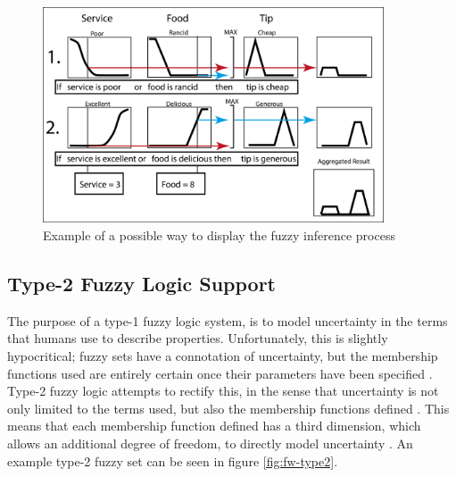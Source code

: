 \begin{figure}[ht!]
	\begin{center}
		\includegraphics[width=0.9\textwidth]{images/inference}
	\end{center}
	\vspace{-2mm}
	\caption{Example of a possible way to display the fuzzy inference process}
	\label{fig:fw-inf}
	\vspace{-1mm}
\end{figure}

\subsection{Type-2 Fuzzy Logic Support}
\label{sec:type2}
The purpose of a type-1 fuzzy logic system, is to model uncertainty in the terms that humans use to describe properties. Unfortunately, this is slightly hypocritical; fuzzy sets have a connotation of uncertainty, but the membership functions used are entirely certain once their parameters have been specified \cite{mendel2003type}. Type-2 fuzzy logic attempts to rectify this, in the sense that uncertainty is not only limited to the terms used, but also the membership functions defined \cite{castillo2003type}. This means that each membership function defined has a third dimension, which allows an additional degree of freedom, to directly model uncertainty \cite{mendel2002type}. An example type-2 fuzzy set can be seen in figure \ref{fig:fw-type2}.

